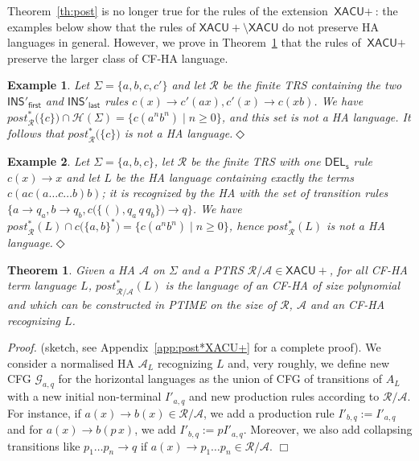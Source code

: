 \documentclass[a4paper]{article}
\theoremstyle{plain}
\newtheorem{theorem}{Theorem}
\newtheorem{example}{Example}{\itshape}{\rmfamily}
\newcommand{\qed}{\hfill $\Box$}
\newcommand{\finex}{\hfill $\Diamond$}
\newenvironment{proof}{\noindent\emph{Proof.}}{}
\newcommand{\R}{\mathcal{R}}
\renewcommand{\H}{\mathcal{H}}
\newcommand{\F}{\Sigma}
\newcommand{\A}{\mathcal{A}}
\newcommand{\G}{\mathcal{G}}
\newcommand{\ptrs}[2]{{#1}{/}{#2}}
\newcommand{\post}{\mathit{post}}
\newcommand{\XACU}{\textsf{XACU}}
\newcommand{\INS}{\mathsf{INS}}
\newcommand{\DEL}{\mathsf{DEL}}
\begin{document}
Theorem~\ref{th:post} is no longer true for the rules of the extension $\XACU+$:
the examples below show that
the rules of $\XACU{+} \setminus \XACU$ do not preserve HA languages in general.
However, we prove in Theorem~\ref{th:postXACU+} that 
the rules of $\XACU+$ preserve the larger class of CF-HA language.

\begin{example}
Let $\F = \{ a,b,c,c'\}$ and let $\R$ be the finite TRS containing the two
$\INS'_\mathsf{first}$ and $\INS'_\mathsf{last}$ rules
${ c(x) \to c'(ax), c'(x) \to c(xb)}$.
We have $\post^*_\R\bigl(\{ c\}\bigr) \cap \H(\F) = \{ c(a^n b^n) \mid n \geq 0 \}$,
and this set is not a HA language. It follows that $\post^*_\R\bigl(\{ c \}\bigr)$
is not a HA language.\finex
\end{example}




\begin{example}
Let $\F = \{ a,b,c\}$, let $\R$ be the finite TRS with
one $\DEL_{\mathsf{s}}$ rule ${ c(x) \to x}$ and
let $L$ be the HA language containing exactly the terms $c(a c(a \ldots c \ldots b) b)$;
it is recognized by the HA with the set of transition rules 
$\bigl\{ a \to q_a, b \to q_b, c\bigl(\{ (), q_a\, q\, q_b\}\bigr) \to q \bigr\}$.
We have $\post^*_\R(L) \cap c\bigl( \{ a, b \}^*\bigr)   = \{ c(a^n b^n) \mid n \geq 0 \}$,
hence $\post^*_\R(L)$  is not a HA language.\finex
\end{example}







\begin{theorem} \label{th:postXACU+}
Given a HA $\A$ on $\Sigma$ and a PTRS $\ptrs{\R}{\A} \in \XACU+$,
for all CF-HA term language $L$, $\post_{\ptrs{\R}{\A}}^*(L)$ 
is the language of an CF-HA of size polynomial 
and which can be constructed in PTIME on 
the size of $\R$, $\A$ and an CF-HA recognizing $L$. 
\end{theorem}
\begin{proof}
(sketch, see Appendix~\ref{app:post*XACU+} for a complete proof).
We consider a normalised HA $\A_L$ recognizing $L$ and,
very roughly, we define new CFG $\G_{a,q}$ for the horizontal languages
as the union of CFG of transitions of $A_L$ with a new initial non-terminal $I'_{a,q}$
and new production rules according to $\ptrs{\R}{\A}$.
For instance, if $a(x) \to b(x) \in \ptrs{\R}{\A}$, 
we add a production rule $I'_{b,q} := I'_{a,q}$ and
for $a(x) \to b(p\, x)$, we add 
$I'_{b,q} := p I'_{a,q}$.
Moreover, we also add collapsing transitions
like $p_1 \ldots p_n \to q$ if $a(x) \to p_1 \ldots p_n \in \ptrs{\R}{\A}$.
\qed
\end{proof}
\end{document}

